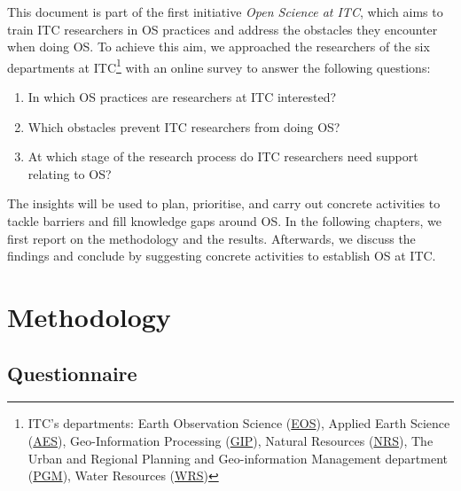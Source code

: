 \documentclass[gc, manuscript]{copernicus}
\begin{document}
This document is part of the first initiative
\textit{Open Science at ITC}, which aims to train ITC researchers in OS
practices and address the obstacles they encounter when doing OS. To
achieve this aim, we approached the researchers of the six departments
at ITC\footnote{ITC's departments: Earth Observation Science
  (\href{https://www.itc.nl/about-itc/organization/scientific-departments/earth-observation-science/profile/}{EOS}),
  Applied Earth Science
  (\href{https://www.itc.nl/about-itc/organization/scientific-departments/earth-systems-analysis/}{AES}),
  Geo-Information Processing
  (\href{https://www.itc.nl/about-itc/organization/scientific-departments/geo-information-processing/}{GIP}),
  Natural Resources
  (\href{https://www.itc.nl/about-itc/organization/scientific-departments/natural-resources/profile/}{NRS}),
  The Urban and Regional Planning and Geo-information Management
  department
  (\href{https://www.itc.nl/about-itc/organization/scientific-departments/urban-regional-planning-geo-information-management/profile/}{PGM}),
  Water Resources
  (\href{https://www.itc.nl/about-itc/organization/scientific-departments/water-resources/profile/}{WRS})}
with an online survey to answer the following questions:

\begin{enumerate}
\def\labelenumi{\arabic{enumi}.}
\item
  In which OS practices are researchers at ITC interested?
\item
  Which obstacles prevent ITC researchers from doing OS?
\item
  At which stage of the research process do ITC researchers need support
  relating to OS?
\end{enumerate}

The insights will be used to plan, prioritise, and carry out concrete
activities to tackle barriers and fill knowledge gaps around OS. In the
following chapters, we first report on the methodology and the results.
Afterwards, we discuss the findings and conclude by suggesting concrete
activities to establish OS at ITC.

\section{Methodology}

\subsection{Questionnaire}
\end{document}
